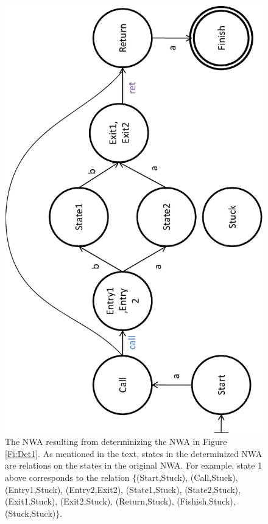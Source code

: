 \begin{figure}[p]
  \centering
    \includegraphics[width=16cm]{Figures/Figure17}
    \caption{The NWA resulting from determinizing the NWA in Figure
      \ref{Fi:Det1}. As mentioned in the text, states in the determinized
      NWA are relations on the states in the original NWA. For example, state
      1 above corresponds to the relation $\{$(Start,Stuck), (Call,Stuck),
      (Entry1,Stuck), (Entry2,Exit2), (State1,Stuck), (State2,Stuck),
      (Exit1,Stuck), (Exit2,Stuck), (Return,Stuck), (Fishish,Stuck),
      (Stuck,Stuck)$\}$.}
 
  \label{Fi:Det2}
\end{figure}


